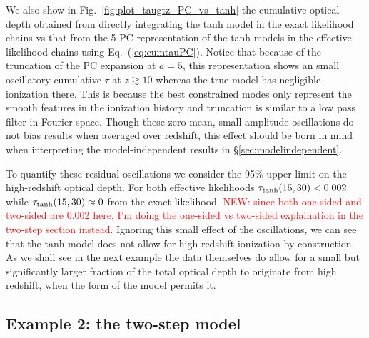 \documentclass[prd,twocolumn,amsmath,amssymb,floatfix,superscriptaddress,nofootinbib]{revtex4-1}
\newcommand{\zmax}{z_{\rm max}}
\newcommand{\ch}[1]{\textcolor{red}{#1}}
\begin{document}


We also show in Fig.~\ref{fig:plot_taugtz_PC_vs_tanh} the cumulative optical depth obtained from directly integrating the tanh model in the exact likelihood chains vs that from the 5-PC representation of the tanh models in the effective likelihood chains using Eq.~(\ref{eq:cumtauPC}).
Notice that because of the truncation of the PC expansion at $a=5$, this representation shows an small oscillatory cumulative $\tau$ at $z \gtrsim 10$ whereas the true model has negligible ionization there.   This is because the best constrained modes only represent the smooth features in the ionization history and truncation is similar to a low pass filter in Fourier space.  Though these zero mean, small amplitude oscillations do not bias results when averaged over redshift, this effect should be born in mind when interpreting the model-independent results in \S\ref{sec:modelindependent}.  

To quantify these residual oscillations we consider 
the 95\% upper limit on the high-redshift optical depth.
For both effective likelihoods  $\tau_{\rm tanh}(15, 30) < 0.002$  while \ch{$\tau_{\rm tanh}(15,30) \approx 0$}
from the exact likelihood. \ch{NEW: since both one-sided and two-sided are 0.002 here, I'm doing the one-sided vs two-sided explaination in the two-step section instead.}
Ignoring this small effect of the oscillations, 
we can see that the tanh model does not allow for high redshift ionization by construction.  As we shall see in the next example the data themselves do allow for a small but significantly larger fraction of the total optical depth to originate from high redshift, when the form of the model permits it.


\subsection{Example 2: the two-step model}
\label{sec:example2}
\end{document}
